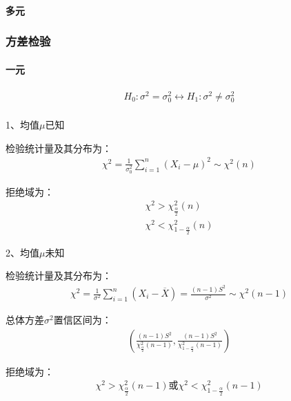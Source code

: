 \documentclass[12pt]{book}
\begin{document}
\paragraph{多元}




\subsubsection{方差检验}

\paragraph{一元}


\begin{gather*}
    H_0: \sigma^2=\sigma_0^2 \leftrightarrow H_1: \sigma^2\neq\sigma_0^2 \\
\end{gather*}


1、均值$\mu$已知

检验统计量及其分布为：
\begin{gather*}
    \chi^2=\frac{1}{\sigma_0^2}\sum_{i=1}^{n}{(X_i-\mu)^2}\sim \chi^2(n)
\end{gather*}


拒绝域为：
\begin{gather*}
    \chi^2>\chi_{\frac{\alpha}{2}}^{2}(n)\\
    \chi^2<\chi_{1-\frac{\alpha}{2}}^{2}(n)
\end{gather*}


2、均值$\mu$未知

检验统计量及其分布为：
\begin{gather*}
    \chi^2=\frac{1}{\sigma^2}\sum_{i=1}^{n}{ \left(X_i- \overline{X}\right) } =\frac{(n-1)S^2}{\sigma^2} \sim \chi^2(n-1)
\end{gather*}


总体方差$\sigma^2$置信区间为：
\begin{gather*}
    \left( \frac{(n-1)S^2}{\chi_{\frac{\alpha}{2}}^{2} (n-1)}, \frac{(n-1)S^2}{\chi_{1-\frac{\alpha}{2}}^{2} (n-1)} \right)
\end{gather*}


拒绝域为：
\begin{gather*}
    \chi^2>\chi_{\frac{\alpha}{2}}^2(n-1) 或 χ^2<χ_{1-\frac{\alpha}{2}}^2(n-1)
\end{gather*}
\end{document}
